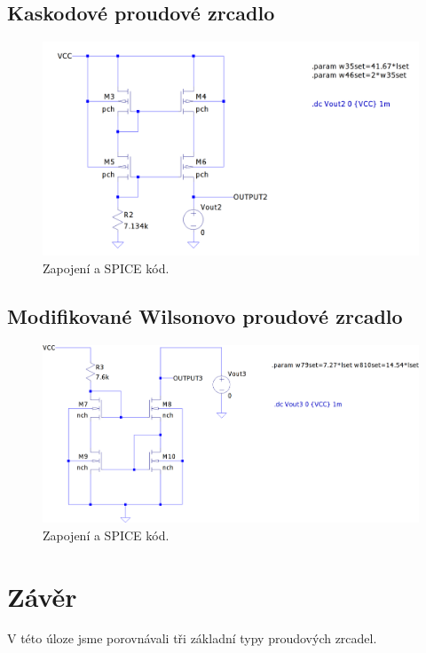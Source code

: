\documentclass{protokol}
\begin{document}
  \clearpage
  
\subsection{Kaskodové proudové zrcadlo}
\begin{figure}[h!]
  \centering
  \includegraphics[scale=0.4]{spice2.png}
  \caption{Zapojení a SPICE kód.}
  \label{fig:spice2-png}
\end{figure}


\clearpage
  
\subsection{Modifikované Wilsonovo proudové zrcadlo}
\begin{figure}[h!]
  \centering
  \includegraphics[scale=0.4]{spice3.png}
  \caption{Zapojení a SPICE kód.}
  \label{fig:spice3-png}
\end{figure}



\clearpage
\section{Závěr}
  V této úloze jsme porovnávali tři základní typy proudových zrcadel. 
\end{document}
